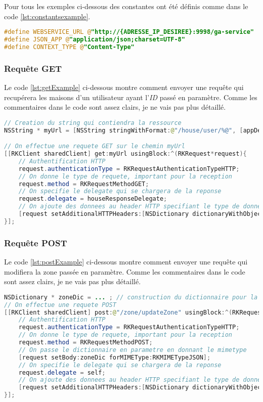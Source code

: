 Pour tous les exemples ci-dessous des constantes ont été définis comme dans le code \ref{lst:constantsexample}.

\begin{lstlisting}[language={C}, caption={Constantes pour les exemples}, label={lst:constantsexample}]
#define WEBSERVICE_URL @"http://{ADRESSE_IP_DESIREE}:9998/ga-service"
#define JSON_APP @"application/json;charset=UTF-8"
#define CONTEXT_TYPE @"Content-Type"
\end{lstlisting}
\subsubsection{Requête GET}
Le code \ref{lst:getExample} ci-dessous montre comment envoyer une requête qui recupérera les maisons d'un utilisateur ayant l'\emph{ID} passé en paramètre. Comme les commentaires dans le code sont assez clairs, je ne vais pas plus détaillé.
\begin{lstlisting}[language={JAVA}, caption={Exemple de requête GET}, label={lst:getExample}]
// Creation du string qui contiendra la ressource
NSString * myUrl = [NSString stringWithFormat:@"/house/user/%@", [appDelegate myUser].userId];

// On effectue une requete GET sur le chemin myUrl
[[RKClient sharedClient] get:myUrl usingBlock:^(RKRequest*request){
	// Authentification HTTP
	request.authenticationType = RKRequestAuthenticationTypeHTTP;
	// On donne le type de requete, important pour la reception
	request.method = RKRequestMethodGET;
	// On specifie le delegate qui se chargera de la reponse
	request.delegate = houseResponseDelegate;
	// On ajoute des donnees au header HTTP specifiant le type de donnees
	[request setAdditionalHTTPHeaders:[NSDictionary dictionaryWithObjectsAndKeys:JSON_APP, CONTEXT_TYPE, nil]];
}];
\end{lstlisting}

\subsubsection{Requête POST}

Le code \ref{lst:postExample} ci-dessous montre comment envoyer une requête qui modifiera la zone passée en paramètre. Comme les commentaires dans le code sont assez clairs, je ne vais pas plus détaillé.

\begin{lstlisting}[language={JAVA}, caption={Exemple de requête POST}, label={lst:postExample}]
NSDictionary * zoneDic = ... ; // construction du dictionnaire pour la requete
// On effectue une requete POST
[[RKClient sharedClient] post:@"/zone/updateZone" usingBlock:^(RKRequest*request){
	// Authentification HTTP
	request.authenticationType = RKRequestAuthenticationTypeHTTP;
	// On donne le type de requete, important pour la reception
	request.method = RKRequestMethodPOST;
	// On passe le dictionnaire en parametre en donnant le mimetype
	[request setBody:zoneDic forMIMEType:RKMIMETypeJSON];
	// On specifie le delegate qui se chargera de la reponse
	request.delegate = self;
	// On ajoute des donnees au header HTTP specifiant le type de donnees
	[request setAdditionalHTTPHeaders:[NSDictionary dictionaryWithObjectsAndKeys:JSON_APP, CONTEXT_TYPE, nil]];
}];
\end{lstlisting}
